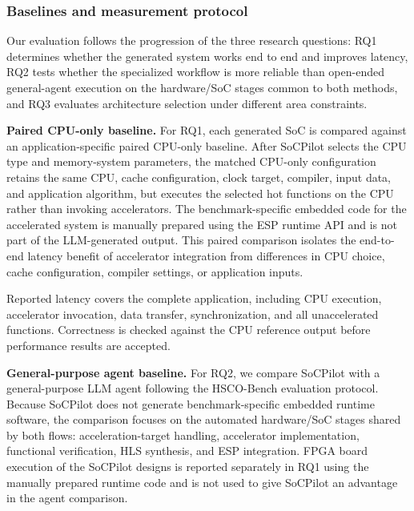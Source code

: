 
\subsubsection{Baselines and measurement protocol}

Our evaluation follows the progression of the three research questions: RQ1 determines whether the generated system works end to end and improves latency, RQ2 tests whether the specialized workflow is more reliable than open-ended general-agent execution on the hardware/SoC stages common to both methods, and RQ3 evaluates architecture selection under different area constraints.

\textbf{Paired CPU-only baseline.}
For RQ1, each generated SoC is compared against an application-specific paired CPU-only baseline. After SoCPilot selects the CPU type and memory-system parameters, the matched CPU-only configuration retains the same CPU, cache configuration, clock target, compiler, input data, and application algorithm, but executes the selected hot functions on the CPU rather than invoking accelerators. The benchmark-specific embedded code for the accelerated system is manually prepared using the ESP runtime API and is not part of the LLM-generated output. This paired comparison isolates the end-to-end latency benefit of accelerator integration from differences in CPU choice, cache configuration, compiler settings, or application inputs.

Reported latency covers the complete application, including CPU execution, accelerator invocation, data transfer, synchronization, and all unaccelerated functions. Correctness is checked against the CPU reference output before performance results are accepted.

\textbf{General-purpose agent baseline.}
For RQ2, we compare SoCPilot with a general-purpose LLM agent following the HSCO-Bench \cite{hscobench2026} evaluation protocol. Because SoCPilot does not generate benchmark-specific embedded runtime software, the comparison focuses on the automated hardware/SoC stages shared by both flows: acceleration-target handling, accelerator implementation, functional verification, HLS synthesis, and ESP integration. FPGA board execution of the SoCPilot designs is reported separately in RQ1 using the manually prepared runtime code and is not used to give SoCPilot an advantage in the agent comparison.

